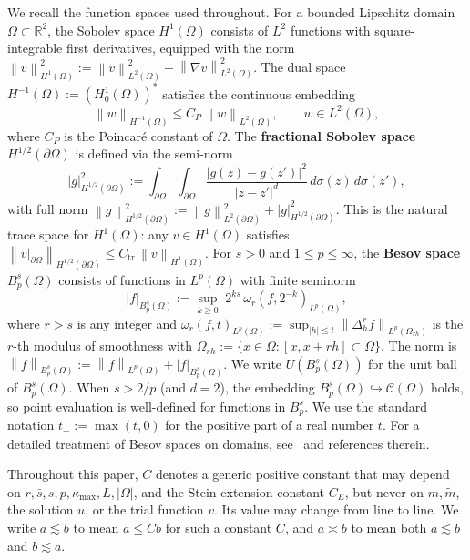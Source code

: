 \documentclass[11pt]{article}
\newcommand{\Omg}{\Omega}
\newcommand{\bOmg}{\partial\Omega}
\newcommand{\C}{\mathcal{C}}
\newcommand{\norm}[1]{\left\|#1\right\|}
\newcommand{\R}{\mathbb{R}}
\begin{document}
We recall the function spaces used throughout.
For a bounded Lipschitz domain $\Omg\subset\R^2$,
the Sobolev space $H^1(\Omg)$ consists of $L^2$ functions
with square-integrable first derivatives, equipped with the norm
$\norm{v}_{H^1(\Omg)}^2 := \norm{v}_{L^2(\Omg)}^2
+ \norm{\nabla v}_{L^2(\Omg)}^2$.
The dual space $H^{-1}(\Omg) := (H^1_0(\Omg))^*$ satisfies
the continuous embedding
\begin{equation}\label{eq:L2_embed}
  \norm{w}_{H^{-1}(\Omg)} \le C_P\,\norm{w}_{L^2(\Omg)},
  \qquad w \in L^2(\Omg),
\end{equation}
where $C_P$ is the Poincar\'e constant of $\Omg$. 
The \textbf{fractional Sobolev space} $H^{1/2}(\bOmg)$ is defined
via the semi-norm
\begin{equation}\label{eq:gagliardo_cont}
  |g|^2_{H^{1/2}(\bOmg)}
  := \int_{\bOmg}\int_{\bOmg}
     \frac{|g(z) - g(z')|^2}{|z - z'|^d}\,
     d\sigma(z)\,d\sigma(z'),
\end{equation}
with full norm
$\norm{g}^2_{H^{1/2}(\bOmg)}
:= \norm{g}^2_{L^2(\bOmg)} + |g|^2_{H^{1/2}(\bOmg)}$.
This is the natural trace space for $H^1(\Omg)$:
any $v\in H^1(\Omg)$ satisfies
$\norm{v|_{\bOmg}}_{H^{1/2}(\bOmg)}
\le C_{\mathrm{tr}}\,\norm{v}_{H^1(\Omg)}$.
For $s > 0$ and $1 \le p \le \infty$, the \textbf{Besov space}
$B^s_p(\Omg)$ consists of functions in $L^p(\Omg)$ with
finite seminorm
\begin{equation}\label{eq:besov_def}
  |f|_{B^s_p(\Omg)}
  := \sup_{k \ge 0}\; 2^{ks}\,
     \omega_r(f, 2^{-k})_{L^p(\Omg)},
\end{equation}
where $r > s$ is any integer and
$\omega_r(f,t)_{L^p(\Omg)}
:= \sup_{|h|\le t}
\norm{\Delta^r_h f}_{L^p(\Omg_{rh})}$
is the $r$-th modulus of smoothness with
$\Omg_{rh} := \{x\in\Omg : [x, x+rh]\subset\Omg\}$.
The norm is
$\norm{f}_{B^s_p(\Omg)} :=
\norm{f}_{L^p(\Omg)} + |f|_{B^s_p(\Omg)}$.
We write $U(B^s_p(\Omg))$ for the unit ball of $B^s_p(\Omg)$.
When $s > 2/p$ (and $d=2$), the embedding
$B^s_p(\Omg) \hookrightarrow \C(\Omg)$ holds,
so point evaluation is well-defined for functions in $B^s_p$.
We use the standard notation $t_+ := \max(t, 0)$ for the
positive part of a real number $t$.
For a detailed treatment of Besov spaces on domains,
see~\cite{devore1993besov} and references therein.
 


Throughout this paper, $C$ denotes a generic
positive constant that may depend on $r, \bar s, s, p, \kappa_{\max},
L, |\Omega|$, and the Stein extension constant $C_E$, but never on
$m, \tilde m$, the solution $u$, or the trial function $v$. Its value
may change from line to line. We write $a \lesssim b$ to mean
$a \le C b$ for such a constant $C$, and $a \asymp b$ to mean both
$a \lesssim b$ and $b \lesssim a$.
\end{document}
